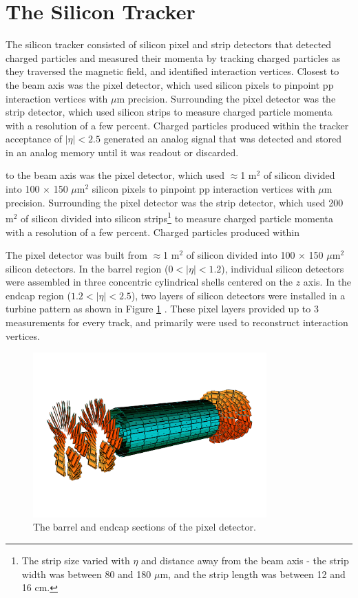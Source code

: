 \section{The Silicon Tracker}
\label{sec:siTrackerDescription}
The silicon tracker consisted of silicon pixel and strip detectors that detected charged particles and measured their 
momenta by tracking charged particles as they traversed the magnetic field, and identified interaction vertices.  Closest 
to the beam axis was the pixel detector, which used silicon pixels to pinpoint pp interaction vertices with $\mu$m precision.  
Surrounding the pixel detector was the strip detector, which used silicon strips to measure charged particle momenta with 
a resolution of a few percent.  Charged particles produced within the tracker acceptance of $|\eta| < 2.5$ generated an 
analog signal that was detected and stored in an analog memory until it was readout or discarded.

to the beam axis was the pixel detector, which used $\approx$1 m$^{2}$ of silicon divided into 100 $\times$ 150 $\mu$m$^{2}$ 
silicon pixels to pinpoint pp interaction vertices with $\mu$m precision.  Surrounding the pixel detector was the strip 
detector, which used 200 m$^{2}$ of silicon divided into silicon strips\footnote{The strip size varied with $\eta$ and 
distance away from the beam axis - the strip width was between 80 and 180 $\mu$m, and the strip length was between 
12 and 16 cm.} to measure charged particle momenta with a resolution of a few percent.  Charged particles produced within 

The pixel detector was built from $\approx$1 m$^{2}$ of silicon divided into 100 $\times$ 150 $\mu$m$^{2}$ silicon detectors.  
In the barrel region ($0 < |\eta| < 1.2$), individual silicon detectors were assembled in three concentric cylindrical shells 
centered on the $z$ axis.  In the endcap region ($1.2 < |\eta| < 2.5$), two layers of silicon detectors were 
installed in a turbine pattern as shown in Figure \ref{fig:pixelTracker} \cite{pixelCommissioning}.  These pixel 
layers provided up to 3 measurements for every track, and primarily were used to reconstruct interaction 
vertices.

\begin{figure}[ht]
	\centering
	\includegraphics[width=0.8\textwidth]{figures/pixelDetectorSchematic.png}
	\caption{The barrel and endcap sections of the pixel detector.}
	\label{fig:pixelTracker}
\end{figure}

